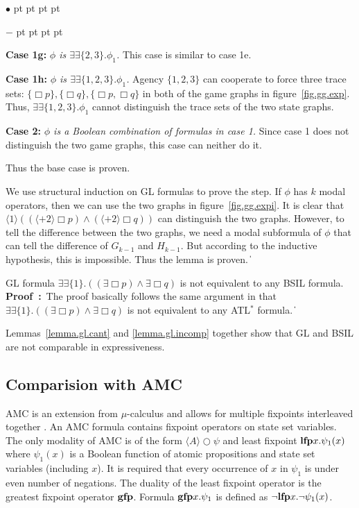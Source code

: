 \documentclass[11pt]{article}
\newcommand{\existsb}{\mbox{$\exists\!\!\exists$}}
\newcommand{\emgfp}{\mbox{\bf gfp}}
\newcommand{\emlfp}{\mbox{\bf lfp}}
\newcommand{\pf}{\noindent\mbox{\bf Proof : }}
\newcommand{\pfrr}{\Box}
\newcommand{\nxt}{\bigcirc}
\def\qed{\ifmmode\|\else{\unskip\nobreak\hfil
\penalty50\hskip1em\null\nobreak\hfil$\blacksquare$
\parfillskip=0pt\finalhyphendemerits=0\endgraf}\fi}
\newenvironment{list1}{\begin{list}{$\bullet$}
{\topsep 0 pt \parsep 0 pt \partopsep 0 pt \itemsep 0 pt}}{\end{list}}
\newenvironment{list2}{\begin{list}{$-$}
{\topsep 0 pt \parsep 0 pt \partopsep 0 pt \itemsep 0 pt}}{\end{list}}
\begin{document}
\begin{list1}
\begin{list2}
    \item {\bf Case 1g:} {\em $\phi$ is
        $\existsb\{2,3\}.\phi_1$.}
        This case is similar to case 1e.
    \item {\bf Case 1h:} {\em $\phi$ is
        $\existsb\{1,2,3\}.\phi_1$.}
        Agency $\{1, 2,3\}$ can cooperate to force three trace sets:
        $\{\pfrr p\}, \{\pfrr q\}, \{\pfrr p,\pfrr q\}$
        in both of the game graphs in figure~\ref{fig.gg.exp}.
        Thus, $\existsb\{1,2,3\}.\phi_1$ cannot distinguish the trace sets of the
        two state graphs.
    \end{list2}
\item {\bf Case 2:} {\em $\phi$ is a Boolean combination of
    formulas in case 1.}
    Since case 1 does not distinguish the two game graphs, 
    this case can neither do it.  
\end{list1}
Thus the base case is proven.

We use structural induction on GL formulas to prove the step.
If $\phi$ has $k$ modal operators,
then we can use the two graphs in figure~\ref{fig.gg.expi}.
It is clear that
$\langle 1\rangle ((\langle+ 2\rangle \pfrr p)
    \wedge (\langle+ 2\rangle \pfrr q))$ can distinguish
the two graphs.
However, to tell the difference between the two graphs,
we need a modal subformula of $\phi$ that can tell the difference
of $G_{k-1}$ and $H_{k-1}$.
But according to the inductive hypothesis, this is impossible.
Thus the lemma is proven.  
\qed 



{\lemma \label{lemma.gl.incomp}
GL formula $\existsb\{1\}.((\exists\pfrr p)\wedge\exists\pfrr q)$
is not equivalent to any BSIL formula.
}
\\\pf The proof basically follows the same argument in \cite{AHK02} 
that $\existsb\{1\}.((\exists\pfrr p)\wedge\exists\pfrr q)$ 
is not equivalent to 
any ATL$^*$ formula.  
\qed 

Lemmas~\ref{lemma.gl.cant} and 
\ref{lemma.gl.incomp} together show that 
GL and BSIL are not comparable in expressiveness.  






\subsection{Comparision with AMC\label{subsec.exp.amc}} 

AMC is an extension from $\mu$-calculus and allows 
for multiple fixpoints interleaved together \cite{AHK02}.  
An AMC formula contains fixpoint operators on state set variables.  
The only modality of AMC is of the form $\langle A\rangle\nxt\psi$ 
and least fixpoint $\emlfp x.\psi_1(x)$ where 
$\psi_1(x)$ is a Boolean function of atomic propositions 
and state set variables (including $x$).  
It is required that every occurrence of $x$ in $\psi_1$ is 
under even number of negations.  
The duality of the least fixpoint operator is the greatest fixpoint 
operator $\emgfp$.  
Formula $\emgfp x.\psi_1$ is defined as $\neg\emlfp x.\neg\psi_1(x)$.  
\end{document}
